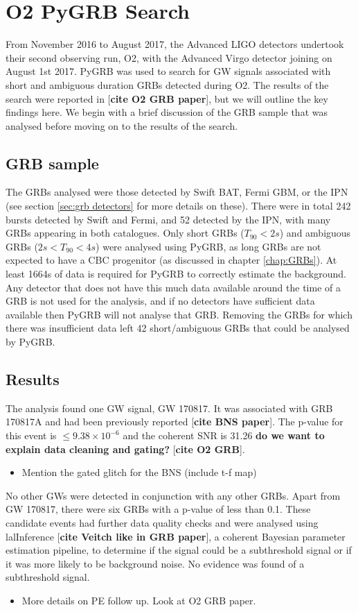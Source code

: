 \documentclass[11pt]{cuthesis}
\begin{document}
\section{O2 PyGRB Search} 
From November 2016 to August 2017, the Advanced LIGO detectors undertook their second observing run, O2, with the Advanced Virgo detector joining on August 1st 2017. PyGRB was used to search for GW signals associated with short and ambiguous duration GRBs detected during O2. The results of the search were reported in [\textbf{cite O2 GRB paper}], but we will outline the key findings here. We begin with a brief discussion of the GRB sample that was analysed before moving on to the results of the search.

\subsection{GRB sample}
The GRBs analysed were those detected by Swift BAT, Fermi GBM, or the IPN (see section \ref{sec:grb detectors} for more details on these). There were in total 242 bursts detected by Swift and Fermi, and 52 detected by the IPN, with many GRBs appearing in both catalogues. Only short GRBs ($T_{90}<2s$) and ambiguous GRBs ($2s<T_{90}<4s$) were analysed using PyGRB, as long GRBs are not expected to have a CBC progenitor (as discussed in chapter \ref{chap:GRBs}). At least 1664s of data is required for PyGRB to correctly estimate the background. Any detector that does not have this much data available around the time of a GRB is not used for the analysis, and if no detectors have sufficient data available then PyGRB will not analyse that GRB. Removing the GRBs for which there was insufficient data left 42 short/ambiguous GRBs that could be analysed by PyGRB.


\subsection{Results}
The analysis found one GW signal, GW 170817. It was associated with GRB 170817A and had been previously reported [\textbf{cite BNS paper}]. The p-value for this event is $\leq 9.38 \times 10^{-6}$ and the coherent SNR is 31.26 \textbf{do we want to explain data cleaning and gating?} [\textbf{cite O2 GRB}]. 
\begin{itemize}
\item Mention the gated glitch for the BNS (include t-f map)
\end{itemize}

No other GWs were detected in conjunction with any other GRBs. Apart from GW 170817, there were six GRBs with a p-value of less than 0.1. These candidate events had further data quality checks and were analysed using lalInference [\textbf{cite Veitch like in GRB paper}], a coherent Bayesian parameter estimation pipeline, to determine if the signal could be a subthreshold signal or if it was more likely to be background noise. No evidence was found of a subthreshold signal. 
\begin{itemize}
\item More details on PE follow up. Look at O2 GRB paper.
\end{itemize}
\end{document}
